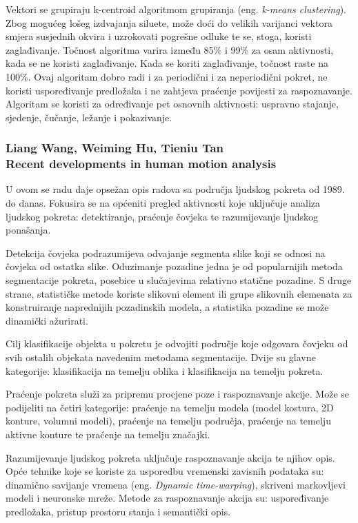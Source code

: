 \documentclass[times, utf8, diplomski]{fer}
\newcommand{\eng}[1]{(eng. \textit{#1})}
\begin{document}
Vektori se grupiraju k-centroid algoritmom grupiranja \eng{k-means clustering}.
Zbog mogućeg lošeg izdvajanja siluete, može doći do velikih varijanci vektora smjera
susjednih okvira i uzrokovati pogrešne odluke te se, stoga, koristi zaglađivanje.
Točnost algoritma varira između 85\% i 99\% za osam aktivnosti, kada se ne koristi
zaglađivanje. Kada se koriti zaglađivanje, točnost raste na 100\%.
Ovaj algoritam dobro radi i za periodični i za neperiodični pokret, ne koristi uspoređivanje
predložaka i ne zahtjeva praćenje povijesti za raspoznavanje. Algoritam se koristi za
određivanje pet osnovnih aktivnosti: uspravno stajanje, sjedenje, čučanje, ležanje i
pokazivanje.


\subsubsection{ Liang Wang, Weiming Hu, Tieniu Tan\\
Recent developments in human motion analysis
 }

U ovom se radu daje opsežan opis radova sa područja ljudskog pokreta od 1989. do danas.
Fokusira se na općeniti pregled aktivnosti koje uključuje analiza ljudskog pokreta:
detektiranje, praćenje čovjeka te razumijevanje ljudskog ponašanja.

Detekcija čovjeka podrazumijeva odvajanje segmenta slike koji se odnosi na čovjeka od
ostatka slike. Oduzimanje pozadine jedna je od popularnijih metoda segmentacije pokreta,
posebice u slučajevima relativno statične pozadine. S druge strane, statističke metode koriste
slikovni element ili grupe slikovnih elemenata za konstruiranje naprednijih pozadinskih
modela, a statistika pozadine se može dinamički ažurirati.

Cilj klasifikacije objekta u pokretu je odvojiti područje koje odgovara čovjeku od svih ostalih
objekata navedenim metodama segmentacije. Dvije su glavne kategorije: klasifikacija na
temelju oblika i klasifikacija na temelju pokreta.

Praćenje pokreta služi za pripremu procjene poze i raspoznavanje akcije. Može se podijeliti na
četiri kategorije: praćenje na temelju modela (model kostura, 2D konture, volumni modeli),
praćenje na temelju područja, praćenje na temelju aktivne konture te praćenje na temelju
značajki.

Razumijevanje ljudskog pokreta uključuje raspoznavanje akcija te njihov opis. Opće tehnike
koje se koriste za usporedbu vremenski zavisnih podataka su: dinamično savijanje vremena
\eng{Dynamic time-warping}, skriveni markovljevi modeli i neuronske mreže. Metode za
raspoznavanje akcija su: uspoređivanje predložaka, pristup prostoru stanja i semantički opis.
\end{document}

